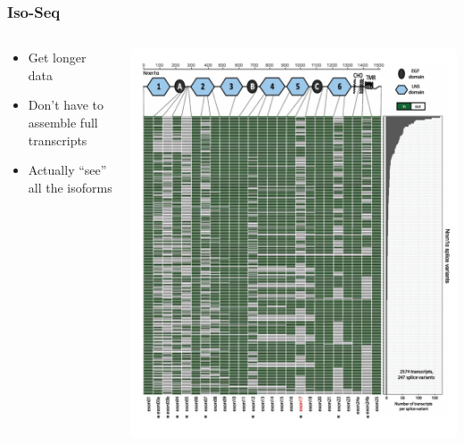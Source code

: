 \documentclass[14pt]{beamer}
\begin{document}
\begin{frame}
\frametitle{Iso-Seq}
\begin{columns}
	\begin{column}{0.4\textwidth}
		\begin{itemize}
			\item<+-> Get longer data
			\item<+-> Don't have to assemble full transcripts
			\item<+-> Actually ``see'' all the isoforms
		\end{itemize}
		\end{column}
	\begin{column}{0.6\textwidth}
		\begin{center}
     		\includegraphics[width=1\textwidth]{images_20170926_isoseqout.png}
     	\end{center}
	\end{column}
\end{columns}
\end{frame}
\end{document}
